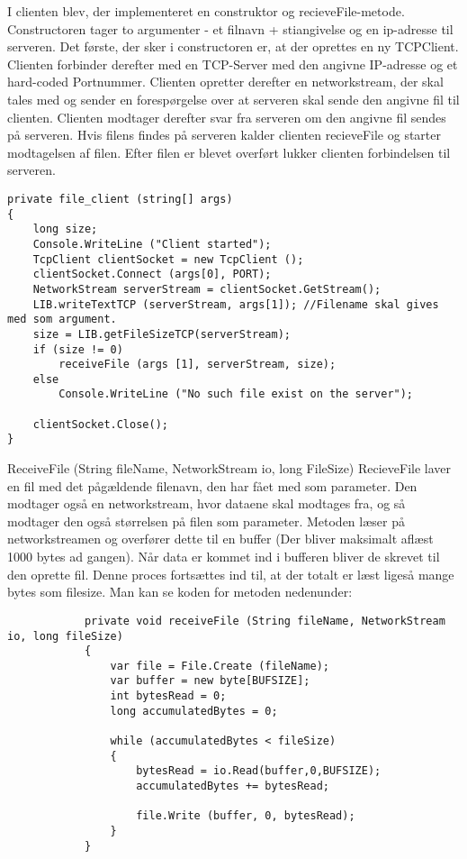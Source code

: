 I clienten blev, der implementeret en construktor og recieveFile-metode.
Constructoren tager to argumenter - et filnavn + stiangivelse og en ip-adresse til serveren.
Det første, der sker i constructoren er, at der oprettes en ny TCPClient. Clienten forbinder derefter med en TCP-Server med den angivne IP-adresse og et hard-coded Portnummer.
Clienten opretter derefter en networkstream, der skal tales med og sender en forespørgelse over at serveren skal sende den angivne fil til clienten. Clienten modtager derefter svar fra serveren om den angivne fil sendes på serveren. Hvis filens findes på serveren kalder clienten recieveFile og starter modtagelsen af filen.
Efter filen er blevet overført lukker clienten forbindelsen til serveren.
\begin{verbatim}
private file_client (string[] args)
{
	long size;
	Console.WriteLine ("Client started");
	TcpClient clientSocket = new TcpClient ();
	clientSocket.Connect (args[0], PORT);
	NetworkStream serverStream = clientSocket.GetStream();
	LIB.writeTextTCP (serverStream, args[1]); //Filename skal gives med som argument.
	size = LIB.getFileSizeTCP(serverStream);
	if (size != 0)
		receiveFile (args [1], serverStream, size);
	else
		Console.WriteLine ("No such file exist on the server");

	clientSocket.Close();
}
\end{verbatim}

\noindent ReceiveFile (String fileName, NetworkStream io, long FileSize) 
RecieveFile laver en fil med det pågældende filenavn, den har fået med som parameter. Den modtager også en networkstream, hvor dataene skal modtages fra, og så modtager den også størrelsen på filen som parameter.
Metoden læser på networkstreamen og overfører dette til en buffer (Der bliver maksimalt aflæst 1000 bytes ad gangen). Når data er kommet ind i bufferen bliver de skrevet til den oprette fil. Denne proces fortsættes ind til, at der totalt er læst ligeså mange bytes som filesize.
Man kan se koden for metoden nedenunder:

\begin{verbatim}
			private void receiveFile (String fileName, NetworkStream io, long fileSize)
			{
				var file = File.Create (fileName);
				var buffer = new byte[BUFSIZE];
				int bytesRead = 0;
				long accumulatedBytes = 0;
			
				while (accumulatedBytes < fileSize) 
				{
					bytesRead = io.Read(buffer,0,BUFSIZE);
					accumulatedBytes += bytesRead;
			
					file.Write (buffer, 0, bytesRead);
				}
			}
\end{verbatim}